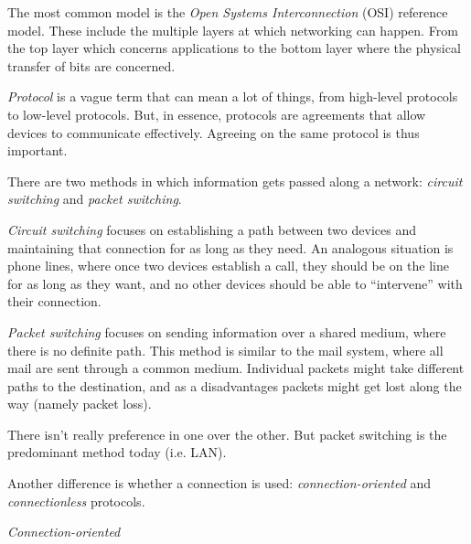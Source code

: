 The most common model is the \textit{Open Systems Interconnection} (OSI) reference model. These include the multiple layers at which networking can happen. From the top layer which concerns applications to the bottom layer where the physical transfer of bits are concerned.

\bigskip

\textit{Protocol} is a vague term that can mean a lot of things, from high-level protocols to low-level protocols. But, in essence, protocols are agreements that allow devices to communicate effectively. Agreeing on the same protocol is thus important.

\bigskip

There are two methods in which information gets passed along a network: \textit{circuit switching} and \textit{packet switching}.

\textit{Circuit switching} focuses on establishing a path between two devices and maintaining that connection for as long as they need. An analogous situation is phone lines, where once two devices establish a call, they should be on the line for as long as they want, and no other devices should be able to ``intervene'' with their connection.

\textit{Packet switching} focuses on sending information over a shared medium, where there is no definite path. This method is similar to the mail system, where all mail are sent through a common medium. Individual packets might take different paths to the destination, and as a disadvantages packets might get lost along the way (namely packet loss).

There isn't really preference in one over the other. But packet switching is the predominant method today (i.e. LAN).

\bigskip

Another difference is whether a connection is used: \textit{connection-oriented} and \textit{connectionless} protocols.

\textit{Connection-oriented} 